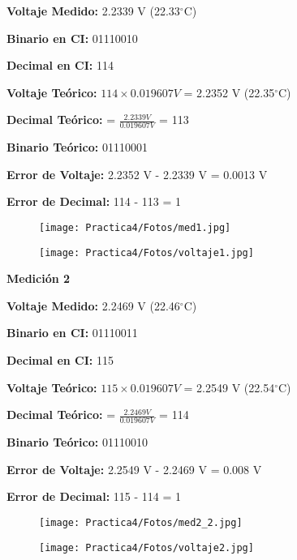 \documentclass[12pt]{article}
\begin{document}
    \textbf{Voltaje Medido:} 2.2339 V (22.33$^{\circ}$C)
    
    \textbf{Binario en CI:} 01110010
    
    \textbf{Decimal en CI:} 114

    \textbf{Voltaje Teórico:} $114 \times 0.019607 V$ = 2.2352 V (22.35$^{\circ}$C)
    
    \textbf{Decimal Teórico:} = $\frac{2.2339V}{0.019607V}$ = 113
    
    \textbf{Binario Teórico:} 01110001
    
    \textbf{Error de Voltaje:} 2.2352 V - 2.2339 V = 0.0013 V
    
    \textbf{Error de Decimal:} 114 - 113 = 1
    
    \begin{figure}[h!]
                \centering
                \texttt{[image: Practica4/Fotos/med1.jpg]}
    \end{figure}
    
    \begin{figure}[h!]
                \centering
                \texttt{[image: Practica4/Fotos/voltaje1.jpg]}
    \end{figure}
    
    \newpage
    \textbf{Medición 2}

    \textbf{Voltaje Medido:} 2.2469 V (22.46$^{\circ}$C)
    
    \textbf{Binario en CI:} 01110011
    
    \textbf{Decimal en CI:} 115

    \textbf{Voltaje Teórico:} $115 \times 0.019607 V$ = 2.2549 V (22.54$^{\circ}$C)
    
    \textbf{Decimal Teórico:} = $\frac{2.2469V}{0.019607V}$ = 114
    
    \textbf{Binario Teórico:} 01110010
    
    \textbf{Error de Voltaje:} 2.2549 V - 2.2469 V = 0.008 V
    
    \textbf{Error de Decimal:} 115 - 114 = 1
    
    \begin{figure}[h!]
                \centering
                \texttt{[image: Practica4/Fotos/med2\_2.jpg]}
    \end{figure}
    
    \begin{figure}[h!]
                \centering
                \texttt{[image: Practica4/Fotos/voltaje2.jpg]}
    \end{figure}
\end{document}
